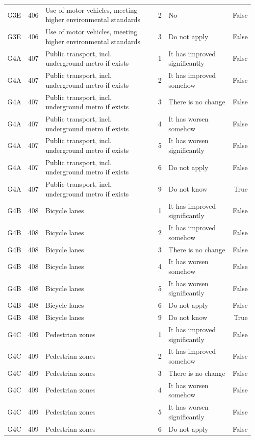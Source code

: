 \begin{tabular}{lrlllr}
G3E & 406 & Use of motor vehicles, meeting higher environmental standards & 2 & No & False \\
G3E & 406 & Use of motor vehicles, meeting higher environmental standards & 3 & Do not apply & False \\
G4A & 407 & Public transport, incl. underground metro if exists & 1 & It has improved significantly & False \\
G4A & 407 & Public transport, incl. underground metro if exists & 2 & It has improved somehow & False \\
G4A & 407 & Public transport, incl. underground metro if exists & 3 & There is no change & False \\
G4A & 407 & Public transport, incl. underground metro if exists & 4 & It has worsen somehow & False \\
G4A & 407 & Public transport, incl. underground metro if exists & 5 & It has worsen significantly & False \\
G4A & 407 & Public transport, incl. underground metro if exists & 6 & Do not apply & False \\
G4A & 407 & Public transport, incl. underground metro if exists & 9 & Do not know & True \\
G4B & 408 & Bicycle lanes & 1 & It has improved significantly & False \\
G4B & 408 & Bicycle lanes & 2 & It has improved somehow & False \\
G4B & 408 & Bicycle lanes & 3 & There is no change & False \\
G4B & 408 & Bicycle lanes & 4 & It has worsen somehow & False \\
G4B & 408 & Bicycle lanes & 5 & It has worsen significantly & False \\
G4B & 408 & Bicycle lanes & 6 & Do not apply & False \\
G4B & 408 & Bicycle lanes & 9 & Do not know & True \\
G4C & 409 & Pedestrian zones & 1 & It has improved significantly & False \\
G4C & 409 & Pedestrian zones & 2 & It has improved somehow & False \\
G4C & 409 & Pedestrian zones & 3 & There is no change & False \\
G4C & 409 & Pedestrian zones & 4 & It has worsen somehow & False \\
G4C & 409 & Pedestrian zones & 5 & It has worsen significantly & False \\
G4C & 409 & Pedestrian zones & 6 & Do not apply & False \\

\end{tabular}
